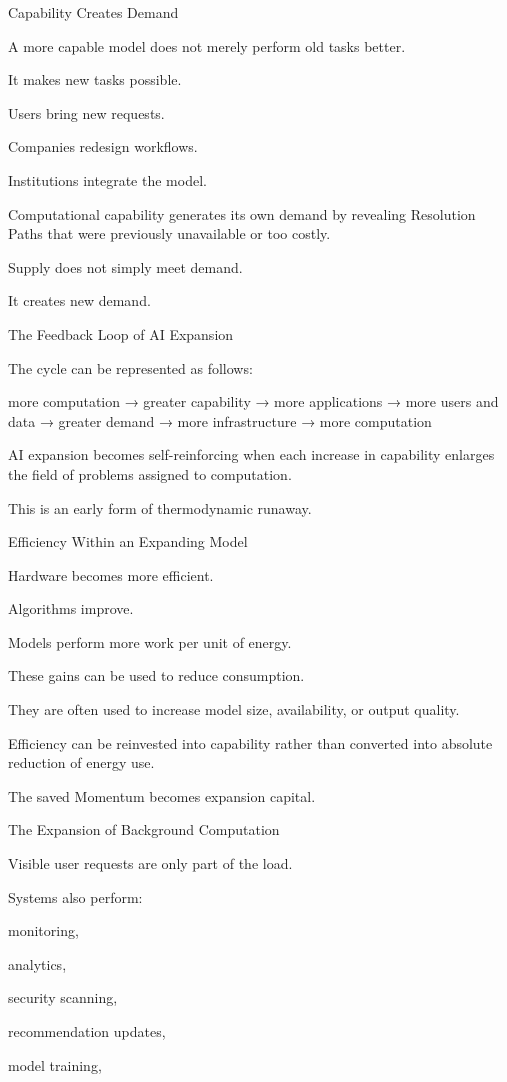 Capability Creates Demand

A more capable model does not merely perform old tasks better.

It makes new tasks possible.

Users bring new requests.

Companies redesign workflows.

Institutions integrate the model.

Computational capability generates its own demand by revealing Resolution Paths that were previously unavailable or too costly.

Supply does not simply meet demand.

It creates new demand.

The Feedback Loop of AI Expansion

The cycle can be represented as follows:

more computation
→ greater capability
→ more applications
→ more users and data
→ greater demand
→ more infrastructure
→ more computation

AI expansion becomes self-reinforcing when each increase in capability enlarges the field of problems assigned to computation.

This is an early form of thermodynamic runaway.

Efficiency Within an Expanding Model

Hardware becomes more efficient.

Algorithms improve.

Models perform more work per unit of energy.

These gains can be used to reduce consumption.

They are often used to increase model size, availability, or output quality.

Efficiency can be reinvested into capability rather than converted into absolute reduction of energy use.

The saved Momentum becomes expansion capital.

The Expansion of Background Computation

Visible user requests are only part of the load.

Systems also perform:

monitoring,

analytics,

security scanning,

recommendation updates,

model training,

